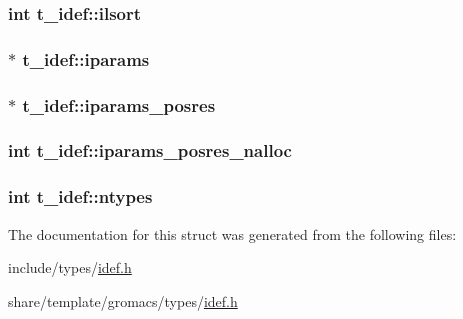 \hypertarget{structt__idef_a196376f25ccf4a60673875b1a9d99a24}{
\subsubsection[{ilsort}]{\setlength{\rightskip}{0pt plus 5cm}int {\bf t\-\_\-idef\-::ilsort}}}\label{structt__idef_a196376f25ccf4a60673875b1a9d99a24}
\hypertarget{structt__idef_af719694c7cdeeffb58ccdd8e266efb6c}{
\subsubsection[{iparams}]{ $\ast$ {\bf t\-\_\-idef\-::iparams}}}\label{structt__idef_af719694c7cdeeffb58ccdd8e266efb6c}
\hypertarget{structt__idef_a035264725416879f3c135db6a4754e98}{
\subsubsection[{iparams\-\_\-posres}]{ $\ast$ {\bf t\-\_\-idef\-::iparams\-\_\-posres}}}\label{structt__idef_a035264725416879f3c135db6a4754e98}
\hypertarget{structt__idef_abf094a1cf982aa4ddd1a16b86dfe8e20}{
\subsubsection[{iparams\-\_\-posres\-\_\-nalloc}]{\setlength{\rightskip}{0pt plus 5cm}int {\bf t\-\_\-idef\-::iparams\-\_\-posres\-\_\-nalloc}}}\label{structt__idef_abf094a1cf982aa4ddd1a16b86dfe8e20}
\hypertarget{structt__idef_afa4f6458df582ca8088573b85f68c8ae}{
\subsubsection[{ntypes}]{\setlength{\rightskip}{0pt plus 5cm}int {\bf t\-\_\-idef\-::ntypes}}}\label{structt__idef_afa4f6458df582ca8088573b85f68c8ae}


\-The documentation for this struct was generated from the following files\-:\begin{DoxyCompactItemize}
\item 
include/types/\hyperlink{include_2types_2idef_8h}{idef.\-h}\item 
share/template/gromacs/types/\hyperlink{share_2template_2gromacs_2types_2idef_8h}{idef.\-h}\end{DoxyCompactItemize}
